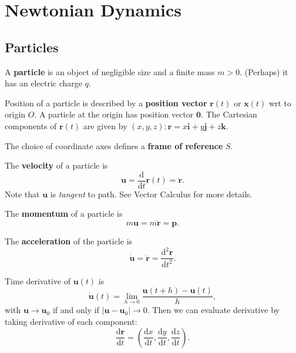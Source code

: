 \section{Newtonian Dynamics}
\subsection{Particles}
\begin{definition}[Particle]
    A \textbf{particle} is an object of negligible size and a finite mass $m>0$. (Perhaps) it has an electric charge $q$. 
\end{definition}
\begin{definition}
    Position of a particle is described by a \textbf{position vector} $\mathbf{r}(t)$ or $\mathbf{x}(t)$ wrt to origin $O$. A particle at the origin has position vector $ \mathbf{0} $. The Cartesian components of $\mathbf{r}(t)$ are given by $(x,y,z): 
    \mathbf{r}= x \mathbf{i} + y\mathbf{j} + z\mathbf{k}$. 
\end{definition}
\begin{definition}
    The choice of coordinate axes defines a \textbf{frame of reference} $S$.
\end{definition}
\begin{definition}[Velocity]
    The \textbf{velocity} of a particle is 
    \[
        \mathbf{u} = \frac{\mathrm{d}}{\mathrm{d}t} \mathbf{r}(t) = \dot{\mathbf{r}}. 
    \]
    Note that $ \mathbf{u} $ is \textit{tangent} to path. See Vector Calculus for more details.
\end{definition}
\begin{definition}[Momentum]
    The \textbf{momentum} of a particle is 
    \[
        m\mathbf{u} = m \dot{\mathbf{r}} = \mathbf{p}.
    \]
\end{definition}
\begin{definition}[Acceleration]
    The \textbf{acceleration} of the particle is 
    \[
        \dot{\mathbf{u}}= \ddot{\mathbf{r}} = \frac{\mathrm{d}^2\mathbf{r}}{\mathrm{d}t^2}.
    \]
\end{definition}
\begin{note}
    Time derivative of $\mathbf{u}(t)$ is
    \[
        \dot{\mathbf{u}}(t) = \lim_{h \to 0} \frac{\mathbf{u}(t+h)-\mathbf{u}(t)}{h},
    \]
    with $\mathbf{u}\to\mathbf{u}_0$ if and only if $|\mathbf{u}-\mathbf{u}_0|\to 0$. Then we can evaluate derivative by taking derivative of each component:
    \[
        \frac{\mathrm{d}\mathbf{r}}{\mathrm{d}t} = \left( \frac{\mathrm{d}x}{\mathrm{d}t}, \frac{\mathrm{d}y}{\mathrm{d}t}, \frac{\mathrm{d}z}{\mathrm{d}t} \right). 
    \]
\end{note}
